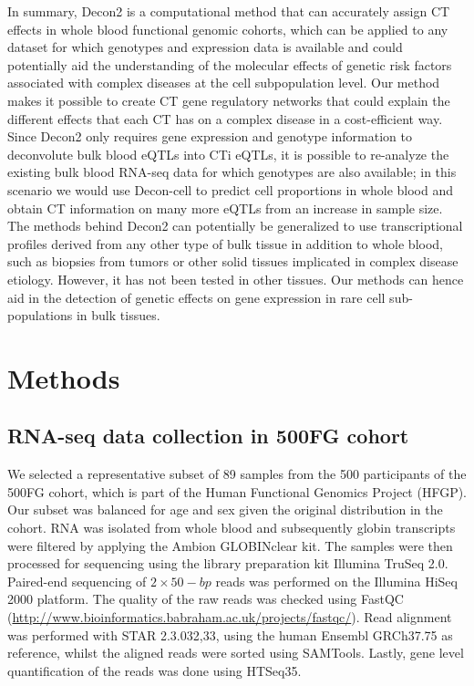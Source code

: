 In summary, Decon2 is a computational method that can accurately assign CT effects in whole blood functional genomic cohorts, which can be applied to any dataset for which genotypes and expression data is available and could potentially aid the understanding of the molecular effects of genetic risk factors associated with complex diseases at the cell subpopulation level. Our method makes it possible to create CT gene regulatory networks that could explain the different effects that each CT has on a complex disease in a cost-efficient way. Since Decon2 only requires  gene expression and genotype information to deconvolute bulk blood eQTLs into CTi eQTLs, it is possible to re-analyze the existing bulk blood RNA-seq data for which genotypes are also available; in this scenario we would use Decon-cell to predict cell proportions in whole blood and obtain CT information on many more eQTLs from an increase in sample size. The methods behind Decon2 can potentially be generalized to use transcriptional profiles derived from any other type of bulk tissue in addition to whole blood, such as biopsies from tumors or other solid tissues implicated in complex disease etiology. However, it has not been tested in other tissues. Our methods can hence aid in the detection of genetic effects on gene expression in rare cell sub-populations in bulk tissues. 

\section{Methods}
\subsection{RNA-seq data collection in 500FG cohort}
We selected a representative subset of 89 samples from the 500 participants of the 500FG cohort, which is part of the Human Functional Genomics Project (HFGP). Our subset was balanced for age and sex given the original distribution in the cohort. RNA was isolated from whole blood and subsequently globin transcripts were filtered by applying the Ambion GLOBINclear kit. The samples were then processed for sequencing using the library preparation kit Illumina TruSeq 2.0. Paired-end sequencing of $2 \times 50-bp$ reads was performed on the Illumina HiSeq 2000 platform. The quality of the raw reads was checked using FastQC (\url{http://www.bioinformatics.babraham.ac.uk/projects/fastqc/}). Read alignment was performed with STAR 2.3.032,33, using the human Ensembl GRCh37.75 as reference, whilst the aligned reads were sorted using SAMTools\cite{liSequenceAlignmentMap2009}. Lastly, gene level quantification of the reads was done using HTSeq35.

